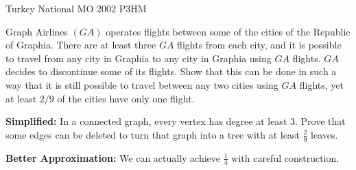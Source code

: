 {Turkey National MO 2002 P3}{HM}{
    Graph Airlines $(GA)$ operates flights between some of the cities
    of the Republic of Graphia. There are at least three $GA$ flights from each
    city, and it is possible to travel from any city in Graphia to any city in
    Graphia using $GA$ flights. $GA$ decides to discontinue some of its flights.
    Show that this can be done in such a way that it is still possible to travel
    between any two cities using $GA$ flights, yet at least $2/9$ of the cities
    have only one flight.

    \textbf{\Share\color{probC}Simplified:} In a connected graph, every
    vertex has degree at least $3$. Prove that some edges can be deleted to
    turn that graph into a tree with at least $\frac{2}{9}$ leaves. 

    \textbf{\Share\color{probC}Better Approximation:} We can actually achieve
    $\frac{1}{4}$ with careful construction.

}

